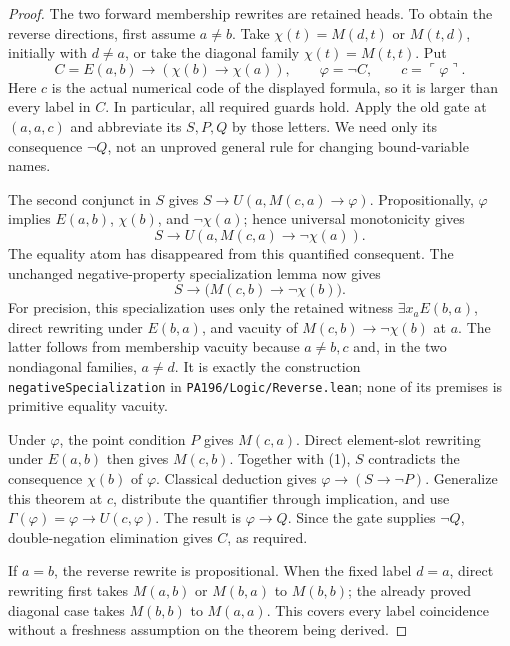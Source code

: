 \begin{proof}
The two forward membership rewrites are retained heads. To obtain the
reverse directions, first assume $a\ne b$. Take
$\chi(t)=M(d,t)$ or $M(t,d)$, initially with $d\ne a$, or take the
diagonal family $\chi(t)=M(t,t)$. Put
\[
 C=E(a,b)\to(\chi(b)\to\chi(a)),\qquad
 \varphi=\neg C,\qquad c=\ulcorner\varphi\urcorner.
\]
Here $c$ is the actual numerical code of the displayed formula, so it is
larger than every label in $C$. In particular, all required guards hold.
Apply the old gate at $(a,a,c)$ and abbreviate its $S,P,Q$ by those
letters. We need only its consequence $\neg Q$, not an unproved general
rule for changing bound-variable names.

The second conjunct in $S$ gives
$S\to U(a,M(c,a)\to\varphi)$. Propositionally,
$\varphi$ implies $E(a,b)$, $\chi(b)$, and $\neg\chi(a)$; hence universal
monotonicity gives
\[
 S\to U(a,M(c,a)\to\neg\chi(a)).
\]
The equality atom has disappeared from this quantified consequent.
The unchanged negative-property specialization lemma now gives
\[
 S\to\bigl(M(c,b)\to\neg\chi(b)\bigr).                 \tag{1}
\]
For precision, this specialization uses only the retained witness
$\exists x_a E(b,a)$, direct rewriting under $E(b,a)$, and vacuity of
$M(c,b)\to\neg\chi(b)$ at $a$. The latter follows from
membership vacuity because $a\ne b,c$ and, in the two nondiagonal
families, $a\ne d$. It is exactly the construction
\texttt{negativeSpecialization} in \texttt{PA196/Logic/Reverse.lean};
none of its premises is primitive equality vacuity.

Under $\varphi$, the point condition $P$ gives $M(c,a)$.
Direct element-slot rewriting under $E(a,b)$ then gives $M(c,b)$.
Together with (1), $S$ contradicts the consequence $\chi(b)$ of
$\varphi$. Classical deduction gives
$\varphi\to(S\to\neg P)$. Generalize this theorem at $c$, distribute
the quantifier through implication, and use
$\Gamma(\varphi)=\varphi\to U(c,\varphi)$. The result is
$\varphi\to Q$. Since the gate supplies $\neg Q$, double-negation
elimination gives $C$, as required.

If $a=b$, the reverse rewrite is propositional. When the fixed label
$d=a$, direct rewriting first takes $M(a,b)$ or $M(b,a)$ to $M(b,b)$;
the already proved diagonal case takes $M(b,b)$ to $M(a,a)$.
This covers every label coincidence without a freshness assumption on
the theorem being derived.


\end{proof}
